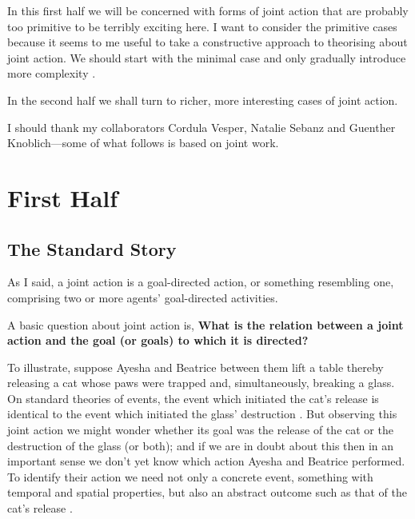 \documentclass[14pt,a4paper]{extarticle}
\begin{document}
In this first half we will be concerned with forms of joint action that are probably too primitive to be terribly exciting here.  
I want to consider the primitive cases because it seems to me useful to take a constructive approach to theorising about joint action. 
We should start with the minimal case and only gradually introduce more complexity \citep{vesper_minimal_2010}.   

In the second half we shall turn to richer, more interesting cases of joint action.

I should thank my collaborators Cordula Vesper, Natalie Sebanz and Guenther Knoblich---some of what follows is based on joint work.





\section{First Half}


\subsection{The Standard Story}

As I said, a joint action is a goal-directed action, or something resembling one, comprising two or more agents' goal-directed activities. 

A basic question about joint action is, 
\textbf{What is the relation between a joint action and the goal (or goals) to which it is directed?}  

To illustrate, suppose Ayesha and Beatrice between them lift a table thereby releasing a cat whose paws were trapped and,  simultaneously, breaking a glass.  On standard theories of events, the event which initiated the cat's release is identical to the event which initiated the glass' destruction \citep{Davidson:1969ie}.  But observing this joint action we might wonder whether its goal was the release of the cat or the destruction of the glass (or both); and if we are in doubt about this then in an important sense we don't yet know which action Ayesha and Beatrice performed.  To identify their action we need not only a concrete event, something with temporal and spatial properties, but also an abstract outcome such as that of the cat's release \citep{Davidson:1971fz}.
\end{document}
